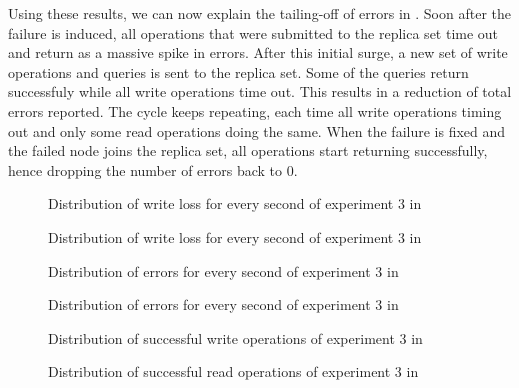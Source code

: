 Using these results, we can now explain the tailing-off of errors in . Soon after the failure is induced, all operations that were submitted to the replica set time out and return as a massive spike in errors. After this initial surge, a new set of write operations and queries is sent to the replica set. Some of the queries return successfuly while all write operations time out. This results in a reduction of total errors reported. The cycle keeps repeating, each time all write operations timing out and only some read operations doing the same. When the failure is fixed and the failed node joins the replica set, all operations start returning successfully, hence dropping the number of errors back to 0. 

\begin{figure}
    
    \caption{Distribution of write loss for every second of experiment 3 in }
    \label{fig:loss-1}
\end{figure}

\begin{figure}
    
    \caption{Distribution of write loss for every second of experiment 3 in }
    \label{fig:loss-2}
\end{figure}

\begin{figure}
    
    \caption{Distribution of errors for every second of experiment 3 in }
    \label{fig:err-1}
\end{figure}

\begin{figure}
    
    \caption{Distribution of errors for every second of experiment 3 in }
    \label{fig:err-2}
\end{figure}

\begin{figure}
    
    \caption{Distribution of successful write operations of experiment 3 in }
    \label{fig:writes-36pmm}
\end{figure}

\begin{figure}
    
    \caption{Distribution of successful read operations of experiment 3 in }
    \label{fig:reads-36pmm}
\end{figure}

